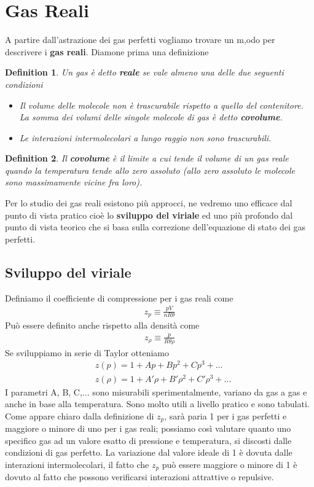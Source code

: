 \documentclass[10pt,a4paper]{article}
\newtheorem{definition}{Definition}
\begin{document}
\section{Gas Reali}
A partire dall'astrazione dei gas perfetti vogliamo trovare un m,odo per descrivere i \textbf{gas reali}. Diamone prima una definizione
\begin{definition}
Un gas è detto \textbf{reale} se vale almeno una delle due seguenti condizioni
\begin{itemize}
\item Il volume delle molecole non è trascurabile rispetto a quello del contenitore. La somma dei volumi delle singole molecole di gas è detto \textbf{covolume}.
\item Le interazioni intermolecolari a lungo raggio non sono trascurabili. 
\end{itemize}
\end{definition}
\begin{definition}
	Il \textbf{covolume} è il limite a cui tende il volume di un gas reale quando la temperatura tende allo zero assoluto (allo zero assoluto le molecole sono massimamente vicine fra loro).
\end{definition}
Per lo studio dei gas reali esistono più approcci, ne vedremo uno efficace dal punto di vista pratico cioè lo \textbf{sviluppo del viriale} ed uno più profondo dal punto di vista teorico che si basa sulla correzione dell'equazione di stato dei gas perfetti. 
\subsection{Sviluppo del viriale}
Definiamo il coefficiente di compressione per i gas reali come
\begin{align*}
	z_p \equiv \frac{p V}{n R \theta}
\end{align*}
Può essere definito anche rispetto alla densità come
\begin{align*}
	z_{\rho} \equiv \frac{p}{R \theta \rho}
\end{align*}
Se sviluppiamo in serie di Taylor otteniamo
\begin{align*}
	&z(p) = 1 + Ap + Bp^2+Cp^3+...\\
	&z(\rho)= 1 + A'\rho + B'\rho^2+C'\rho^3+...
\end{align*}
I parametri A, B, C,... sono misurabili sperimentalmente, variano da gas a gas e anche in base alla temperatura. Sono molto utili a livello pratico e sono tabulati. Come appare chiaro dalla definizione di $z_p$, sarà paria 1 per i gas perfetti e maggiore o minore di uno per i gas reali; possiamo così valutare quanto uno specifico gas ad un valore esatto di pressione e temperatura, si discosti dalle condizioni di gas perfetto. La variazione dal valore ideale di 1 è dovuta dalle interazioni intermolecolari, il fatto che $z_p$ può essere maggiore o minore di 1 è dovuto al fatto che possono verificarsi interazioni attrattive o repulsive. 
\end{document}

